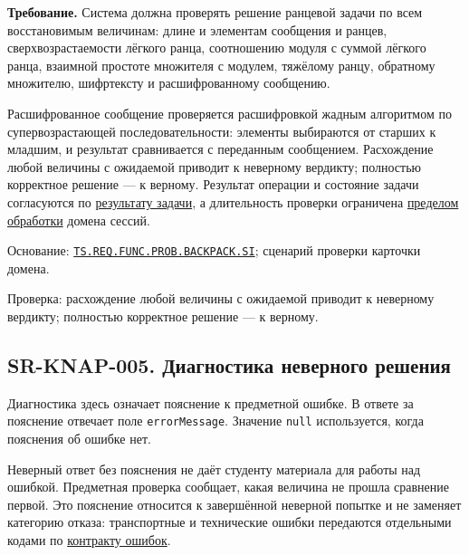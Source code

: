 \documentclass[12pt,a4paper]{article}
\begin{document}
\textbf{Требование.} Система должна проверять решение ранцевой задачи по всем восстановимым величинам: длине и элементам сообщения и ранцев, сверхвозрастаемости лёгкого ранца, соотношению модуля с суммой лёгкого ранца, взаимной простоте множителя с модулем, тяжёлому ранцу, обратному множителю, шифртексту и расшифрованному сообщению.

Расшифрованное сообщение проверяется расшифровкой жадным алгоритмом по супервозрастающей последовательности: элементы выбираются от старших к младшим, и результат сравнивается с переданным сообщением. Расхождение любой величины с ожидаемой приводит к неверному вердикту; полностью корректное решение --- к верному. Результат операции и состояние задачи согласуются по {\hyperlink{sr-ses-005-результат-задачи}{результату задачи}}, а длительность проверки ограничена {\hyperlink{sr-ses-012-ограниченная-длительность-обработки}{пределом обработки}} домена сессий.

Основание: {\href{../02\_Техническое\_задание/Техническое\_задание.pdf\#ts-req-func-prob-backpack-si}{\texttt{TS.\allowbreak{}REQ.\allowbreak{}FUNC.\allowbreak{}PROB.\allowbreak{}BACKPACK.\allowbreak{}SI}}}; сценарий проверки карточки домена.

Проверка: расхождение любой величины с ожидаемой приводит к неверному вердикту; полностью корректное решение --- к верному.

\subsection{SR-KNAP-005. Диагностика неверного решения}\label{sr-knap-005-ux434ux438ux430ux433ux43dux43eux441ux442ux438ux43aux430-ux43dux435ux432ux435ux440ux43dux43eux433ux43e-ux440ux435ux448ux435ux43dux438ux44f}

\hypertarget{sr-knap-005-диагностика-неверного-решения}{}

\hypertarget{sr-knap-005}{}

Диагностика здесь означает пояснение к предметной ошибке. В ответе за пояснение отвечает поле \texttt{errorMessage}. Значение \texttt{null} используется, когда пояснения об ошибке нет.

Неверный ответ без пояснения не даёт студенту материала для работы над ошибкой. Предметная проверка сообщает, какая величина не прошла сравнение первой. Это пояснение относится к завершённой неверной попытке и не заменяет категорию отказа: транспортные и технические ошибки передаются отдельными кодами по {\href{../07\_Программные\_требования/DOC-06.2\_Сессии\_задач\_и\_планировщик.pdf\#коды-и-представление-ошибок}{контракту ошибок}}.
\end{document}
